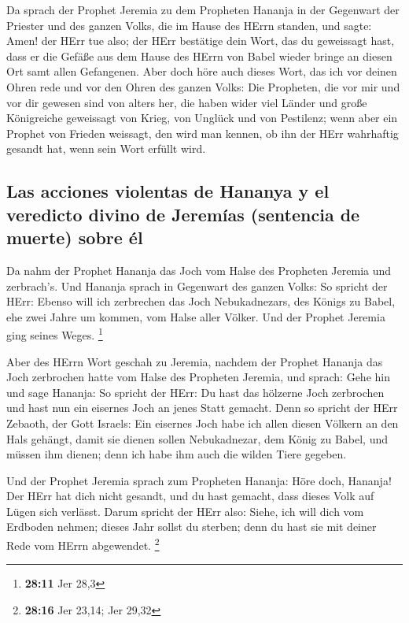  Da sprach der Prophet Jeremia zu dem Propheten Hananja in
der Gegenwart der Priester und des ganzen Volks, die im Hause des HErrn
standen,  und sagte: Amen! der HErr tue also; der HErr
bestätige dein Wort, das du geweissagt hast, dass er die Gefäße aus dem
Hause des HErrn von Babel wieder bringe an diesen Ort samt allen
Gefangenen.  Aber doch höre auch dieses Wort, das ich vor
deinen Ohren rede und vor den Ohren des ganzen Volks:  Die
Propheten, die vor mir und vor dir gewesen sind von alters her, die
haben wider viel Länder und große Königreiche geweissagt von Krieg, von
Unglück und von Pestilenz;  wenn aber ein Prophet von
Frieden weissagt, den wird man kennen, ob ihn der HErr wahrhaftig
gesandt hat, wenn sein Wort erfüllt wird.

\hypertarget{las-acciones-violentas-de-hananya-y-el-veredicto-divino-de-jeremuxedas-sentencia-de-muerte-sobre-uxe9l}{%
\subsection{Las acciones violentas de Hananya y el veredicto divino de
Jeremías (sentencia de muerte) sobre
él}\label{las-acciones-violentas-de-hananya-y-el-veredicto-divino-de-jeremuxedas-sentencia-de-muerte-sobre-uxe9l}}

 Da nahm der Prophet Hananja das Joch vom Halse des
Propheten Jeremia und zerbrach's.  Und Hananja sprach in
Gegenwart des ganzen Volks: So spricht der HErr: Ebenso will ich
zerbrechen das Joch Nebukadnezars, des Königs zu Babel, ehe zwei Jahre
um kommen, vom Halse aller Völker. Und der Prophet Jeremia ging seines
Weges. \footnote{\textbf{28:11} Jer 28,3}

 Aber des HErrn Wort geschah zu Jeremia, nachdem der
Prophet Hananja das Joch zerbrochen hatte vom Halse des Propheten
Jeremia, und sprach:  Gehe hin und sage Hananja: So
spricht der HErr: Du hast das hölzerne Joch zerbrochen und hast nun ein
eisernes Joch an jenes Statt gemacht.  Denn so spricht
der HErr Zebaoth, der Gott Israels: Ein eisernes Joch habe ich allen
diesen Völkern an den Hals gehängt, damit sie dienen sollen
Nebukadnezar, dem König zu Babel, und müssen ihm dienen; denn ich habe
ihm auch die wilden Tiere gegeben.

 Und der Prophet Jeremia sprach zum Propheten Hananja:
Höre doch, Hananja! Der HErr hat dich nicht gesandt, und du hast
gemacht, dass dieses Volk auf Lügen sich verlässt.  Darum
spricht der HErr also: Siehe, ich will dich vom Erdboden nehmen; dieses
Jahr sollst du sterben; denn du hast sie mit deiner Rede vom HErrn
abgewendet. \footnote{\textbf{28:16} Jer 23,14; Jer 29,32}

